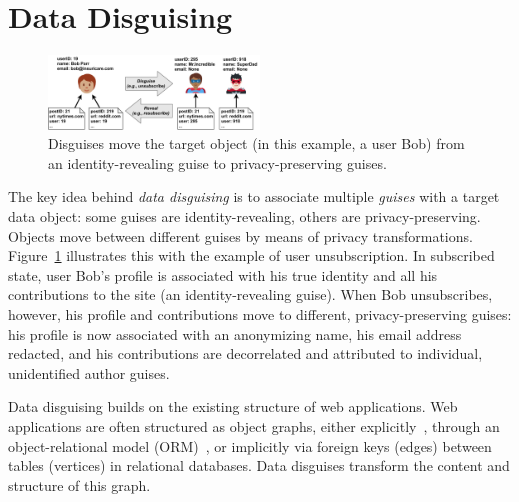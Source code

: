 \section{Data Disguising}
\begin{figure}[t!]
    \centering
    \includegraphics[width=0.5\textwidth]{img/disguises}

    \caption{Disguises move the target object (in this example, a user Bob) from an identity-revealing
    guise to privacy-preserving guises.}
    \label{fig:example}
\end{figure}


%
The key idea behind \emph{data disguising} is to associate multiple \emph{guises} with a target
data object: some guises are identity-revealing, others are privacy-preserving.
%
Objects move between different guises by means of privacy transformations.
%
Figure~\ref{fig:example} illustrates this with the example of user unsubscription.
%
In subscribed state, user Bob's profile is associated with his true identity and all his
contributions to the site (an identity-revealing guise).
%
When Bob unsubscribes, however, his profile and contributions move to different,
privacy-preserving guises: his profile is now associated with an anonymizing name, his email
address redacted, and his contributions are decorrelated and attributed to individual,
unidentified author guises.
%

%
Data disguising builds on the existing structure of web applications.
%
Web applications are often structured as object graphs, either explicitly~\cite{tao, delf},
through an object-relational model (ORM)~\cite{orm}, or implicitly via foreign keys (edges)
between tables (vertices) in relational databases.
%
Data disguises transform the content and structure of this graph.
%

